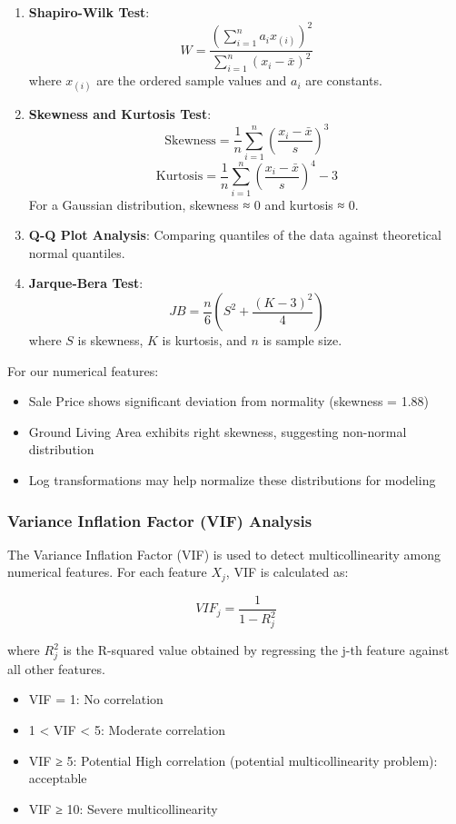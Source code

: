 \documentclass[12pt]{report}
\begin{document}
\begin{enumerate}
    \item \textbf{Shapiro-Wilk Test}:
    \[ W = \frac{(\sum_{i=1}^n a_i x_{(i)})^2}{\sum_{i=1}^n (x_i - \bar{x})^2} \]
    where $x_{(i)}$ are the ordered sample values and $a_i$ are constants.
    
    \item \textbf{Skewness and Kurtosis Test}:
    \[ \text{Skewness} = \frac{1}{n} \sum_{i=1}^n (\frac{x_i - \bar{x}}{s})^3 \]
    \[ \text{Kurtosis} = \frac{1}{n} \sum_{i=1}^n (\frac{x_i - \bar{x}}{s})^4 - 3 \]
    For a Gaussian distribution, skewness ≈ 0 and kurtosis ≈ 0.
    
    \item \textbf{Q-Q Plot Analysis}: Comparing quantiles of the data against theoretical normal quantiles.
    
    \item \textbf{Jarque-Bera Test}:
    \[ JB = \frac{n}{6}(S^2 + \frac{(K-3)^2}{4}) \]
    where $S$ is skewness, $K$ is kurtosis, and $n$ is sample size.
\end{enumerate}

For our numerical features:
\begin{itemize}
    \item Sale Price shows significant deviation from normality (skewness = 1.88)
    \item Ground Living Area exhibits right skewness, suggesting non-normal distribution
    \item Log transformations may help normalize these distributions for modeling
\end{itemize}

\subsubsection{Variance Inflation Factor (VIF) Analysis}
The Variance Inflation Factor (VIF) is used to detect multicollinearity among numerical features. For each feature $X_j$, VIF is calculated as:

\[ VIF_j = \frac{1}{1-R^2_j} \]

where $R^2_j$ is the R-squared value obtained by regressing the j-th feature against all other features. 

\begin{itemize}
    \item VIF = 1: No correlation
    \item 1 < VIF < 5: Moderate correlation
    \item VIF ≥ 5: Potential High correlation (potential multicollinearity problem): acceptable
    \item VIF ≥ 10: Severe multicollinearity
\end{itemize}
\end{document}
